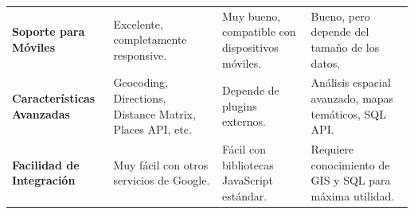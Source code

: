 \begin{table}[h]
\begin{tabular}{p{3cm} p{3cm} p{2.5cm} p{2.5cm} }
        \textbf{Soporte para Móviles}    & Excelente, completamente responsive. & Muy bueno, compatible con dispositivos móviles. & Bueno, pero depende del tamaño de los datos. \\
        
        \textbf{Características Avanzadas} & Geocoding, Directions, Distance Matrix, Places API, etc. & Depende de plugins externos. & Análisis espacial avanzado, mapas temáticos, SQL API. \\
        
        \textbf{Facilidad de Integración} & Muy fácil con otros servicios de Google. & Fácil con bibliotecas JavaScript estándar. & Requiere conocimiento de GIS y SQL para máxima utilidad. \\
    \bottomrule
    \end{tabular}
    \label{tabla:comparativa_api_mapas}
\end{table}
